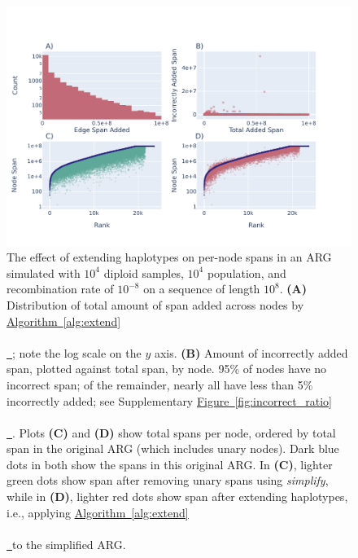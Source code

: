 \documentclass[10pt,twoside,lineno]{gsajnl}
\newcommand{\algorithmref}[2][]{%
	\hyperref[{#2}]{%
		Algorithm~\ref*{#2}%
		\ifx\\#1\\%
		\else
		\,#1%
		\fi
	}%
}
\newcommand*{\figref}[2][]{%
	\hyperref[{#2}]{%
		Figure~\ref*{#2}%
		\ifx\\#1\\%
		\else
		\,#1%
		\fi
	}%
}
\begin{document}
\begin{figure}[!bht]
	\includegraphics{newplots_wo_ee/figure-4.pdf}
	\caption{
        The effect of extending haplotypes on per-node spans
        in an ARG simulated with $10^4$ diploid samples, $10^4$ population, and 
        recombination rate of $10^{-8}$ on a sequence of length $10^8$.
        \textbf{(A)}
        Distribution of total amount of span added across nodes by \algorithmref{alg:extend};
        note the log scale on the $y$ axis.
        \textbf{(B)}
        Amount of incorrectly added span, plotted against total span, by node.
        95\% of nodes have no incorrect span; of the remainder,
        nearly all have less than 5\% incorrectly added;
        see Supplementary \figref{fig:incorrect_ratio}.
        Plots \textbf{(C)} and \textbf{(D)} show total spans per node,
        ordered by total span in the original ARG (which includes unary nodes).
        Dark blue dots in both show the spans in this original ARG.
        In \textbf{(C)}, lighter green dots show
        span after removing unary spans using \textit{simplify},
        while in \textbf{(D)},
        lighter red dots show span after extending haplotypes,
        i.e., applying \algorithmref{alg:extend} to the simplified ARG.
    }
	\label{fig:node-spans}
\end{figure}
\end{document}
